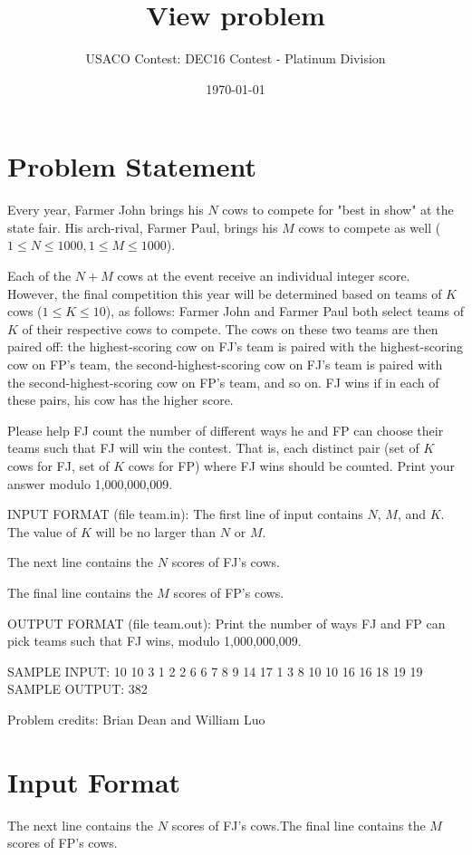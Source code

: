 \documentclass[12pt]{article}
\title{View problem}
\author{USACO Contest: DEC16 Contest - Platinum Division}
\date{\today}
\begin{document}
\maketitle

\section*{Problem Statement}

Every year, Farmer John brings his $N$ cows to compete for "best in show" at the
state fair.  His arch-rival, Farmer Paul, brings his $M$ cows to compete as well
($1 \leq N \leq 1000, 1 \leq M \leq 1000$). 

Each of the $N + M$ cows at the event receive an individual integer
score.  However, the final competition this year will be determined
based on teams of $K$ cows ($1 \leq K \leq 10$), as follows: Farmer
John and Farmer Paul both select teams of $K$ of their respective cows
to compete.  The cows on these two teams are then paired off: the
highest-scoring cow on FJ's team is paired with the highest-scoring
cow on FP's team, the second-highest-scoring cow on FJ's team is
paired with the second-highest-scoring cow on FP's team, and so on.
FJ wins if in each of these pairs, his cow has the higher score.  

Please help FJ count the number of different ways he and FP can
choose their teams such that FJ will win the contest.  That is, each
distinct pair (set of $K$ cows for FJ, set of $K$ cows for FP)
where FJ wins should be counted.  Print your answer modulo
1,000,000,009.

INPUT FORMAT (file team.in):
The first line of input contains $N$, $M$, and $K$.  The value of $K$ will be no
larger than $N$ or $M$.

The next line contains the $N$ scores of FJ's cows.

The final line contains the $M$ scores of FP's cows.

OUTPUT FORMAT (file team.out):
Print the number of ways FJ and FP can pick teams such that FJ wins, modulo
1,000,000,009.

SAMPLE INPUT:
10 10 3
1 2 2 6 6 7 8 9 14 17
1 3 8 10 10 16 16 18 19 19
SAMPLE OUTPUT: 
382


Problem credits: Brian Dean and William Luo



\section*{Input Format}
The next line contains the $N$ scores of FJ's cows.The final line contains the $M$ scores of FP's cows.
\end{document}
